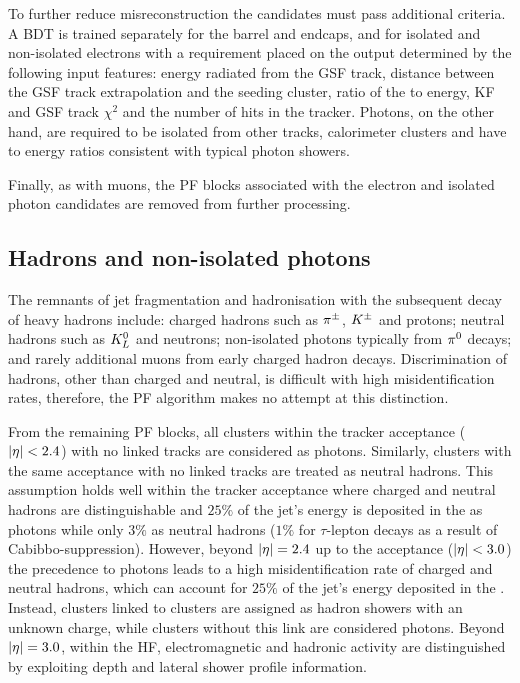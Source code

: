 To further reduce misreconstruction the candidates must pass additional
criteria. A BDT is trained separately for the barrel and endcaps, and for
isolated and non-isolated electrons with a requirement placed on the output
determined by the following input features: energy radiated from the GSF
track, distance between the GSF track extrapolation and the \ECAL seeding
cluster, ratio of the \HCAL to \ECAL energy, KF and GSF track $\chi^2$ and the
number of hits in the tracker. Photons, on the other hand, are required to be
isolated from other tracks, calorimeter clusters and have \HCAL to \ECAL
energy ratios consistent with typical photon showers.

Finally, as with muons, the PF blocks associated with the electron and
isolated photon candidates are removed from further processing.


\subsection{Hadrons and non-isolated photons}

The remnants of jet fragmentation and hadronisation with the subsequent decay
of heavy hadrons include: charged hadrons such as $\pi^{\pm}$, $K^{\pm}$ and
protons; neutral hadrons such as $K_L^{0}$ and neutrons; non-isolated photons
typically from $\pi^{0}$ decays; and rarely additional muons from early
charged hadron decays. Discrimination of hadrons, other than charged and
neutral, is difficult with high misidentification rates, therefore, the PF
algorithm makes no attempt at this distinction.

From the remaining PF blocks, all \ECAL clusters within the tracker acceptance
(${|\eta|<2.4}$) with no linked tracks are considered as photons. Similarly,
\HCAL clusters with the same acceptance with no linked tracks are treated as
neutral hadrons. This assumption holds well within the tracker acceptance where
charged and neutral hadrons are distinguishable and $25\%$ of the jet's energy
is deposited in the \ECAL as photons while only $3\%$ as neutral hadrons
($1\%$ for $\tau$-lepton decays as a result of Cabibbo-suppression). However,
beyond ${|\eta|=2.4}$ up to the \ECAL acceptance (${|\eta|<3.0}$) the precedence
to photons leads to a high misidentification rate of charged and neutral
hadrons, which can account for $25\%$ of the jet's energy deposited in the
\ECAL. Instead, \ECAL clusters linked to \HCAL clusters are assigned as hadron
showers with an unknown charge, while \ECAL clusters without this link are
considered photons. Beyond ${|\eta|=3.0}$, within the HF, electromagnetic and
hadronic activity are distinguished by exploiting depth and lateral
shower profile information.

